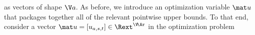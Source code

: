 as vectors of shape $\V a$.
As before, we introduce an optimization variable $\mat u$ that packages together
    all of the relevant pointwise upper bounds.
To that end, consider a 
vector
$\mat u = [u_{a,s,t}] \in \Rext^{\V\!\Ar}$
in the optimization problem
%
%
